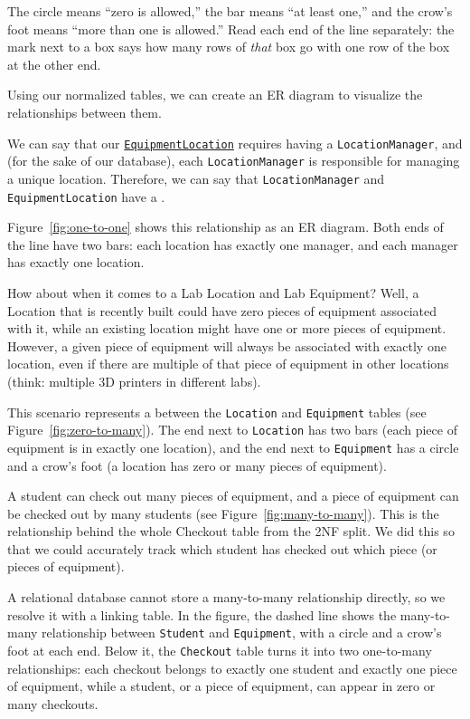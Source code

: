 The circle means ``zero is allowed,'' the bar means ``at least one,'' and the crow's foot means ``more than one is allowed.'' Read each end of the line separately: the mark next to a box says how many rows of \emph{that} box go with one row of the box at the other end.

Using our normalized tables, we can create an ER diagram to visualize the relationships between them.

We can say that our \underline{\texttt{EquipmentLocation}} requires having a \texttt{LocationManager}, and (for the sake of our database), each \texttt{LocationManager} is responsible for managing a unique location. Therefore, we can say that 
\texttt{LocationManager} and \texttt{EquipmentLocation} have a .

Figure~\ref{fig:one-to-one} shows this relationship as an ER diagram. Both ends of the line have two bars: each location has exactly one manager, and each manager has exactly one location.


How about when it comes to a Lab Location and Lab Equipment? Well, a Location that is recently built could have zero pieces of equipment associated with it, while an existing location might have one or more pieces of equipment. However, a given piece of equipment will always be associated with exactly one location, even if there are multiple of that piece of equipment in other locations (think: multiple 3D printers in different labs).

This scenario represents a  between the \texttt{Location} and \texttt{Equipment} tables (see Figure~\ref{fig:zero-to-many}). The end next to \texttt{Location} has two bars (each piece of equipment is in exactly one location), and the end next to \texttt{Equipment} has a circle and a crow's foot (a location has zero or many pieces of equipment).

A student can check out many pieces of equipment, and a piece of equipment can be checked out by many students (see Figure~\ref{fig:many-to-many}). This is the relationship behind the whole Checkout table from the 2NF split. We did this so that we could accurately track which student has checked out which piece (or pieces of equipment).

A relational database cannot store a many-to-many relationship directly, so we resolve it with a linking table. In the figure, the dashed line shows the many-to-many relationship between \texttt{Student} and \texttt{Equipment}, with a circle and a crow's foot at each end. Below it, the \texttt{Checkout} table turns it into two one-to-many relationships: each checkout belongs to exactly one student and exactly one piece of equipment, while a student, or a piece of equipment, can appear in zero or many checkouts.

